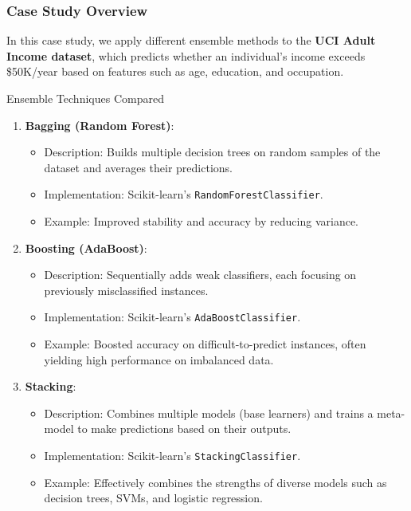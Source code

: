 \documentclass[aspectratio=169]{beamer}
\begin{document}
\begin{frame}
    \frametitle{Case Study Overview}
    
    In this case study, we apply different ensemble methods to the \textbf{UCI Adult Income dataset}, which predicts whether an individual's income exceeds \$50K/year based on features such as age, education, and occupation.
    
    \begin{block}{Ensemble Techniques Compared}
        \begin{enumerate}
            \item \textbf{Bagging (Random Forest)}:
                \begin{itemize}
                    \item Description: Builds multiple decision trees on random samples of the dataset and averages their predictions.
                    \item Implementation: Scikit-learn's \texttt{RandomForestClassifier}.
                    \item Example: Improved stability and accuracy by reducing variance.
                \end{itemize}
            \item \textbf{Boosting (AdaBoost)}:
                \begin{itemize}
                    \item Description: Sequentially adds weak classifiers, each focusing on previously misclassified instances.
                    \item Implementation: Scikit-learn's \texttt{AdaBoostClassifier}.
                    \item Example: Boosted accuracy on difficult-to-predict instances, often yielding high performance on imbalanced data.
                \end{itemize}
            \item \textbf{Stacking}:
                \begin{itemize}
                    \item Description: Combines multiple models (base learners) and trains a meta-model to make predictions based on their outputs.
                    \item Implementation: Scikit-learn's \texttt{StackingClassifier}.
                    \item Example: Effectively combines the strengths of diverse models such as decision trees, SVMs, and logistic regression.
                \end{itemize}
        \end{enumerate}
    \end{block}
\end{frame}
\end{document}
